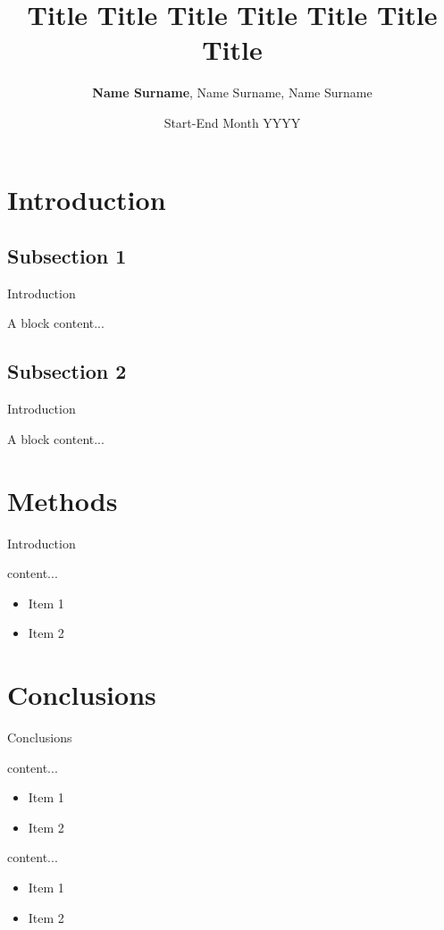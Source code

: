 \documentclass[10pt, aspectratio=169, handout]{aiasprestikz}
\author{\textbf{Name Surname}, Name Surname, Name Surname}
\affiliation{\textbf{Affil1}, Affil2}
\title{Title Title Title Title Title Title Title}
\date{Start-End Month YYYY}
\begin{document}
	
	\maketitle

	\section{Introduction}
	\subsection{Subsection 1}
	\begin{frame}{Introduction}
		\onslide<2->\begin{blox}{A block}
			content...
		\end{blox}
	\end{frame}
	
	\subsection{Subsection 2}
	\begin{frame}{Introduction}
		\onslide<2->\begin{blox}{A block}
			content...
		\end{blox}
	\end{frame}
	
	\section{Methods}
	\begin{frame}{Introduction}
		\begin{blox}{content...}
			\begin{itemize}
				\item Item 1
				\item Item 2
			\end{itemize}
		\end{blox}
	\end{frame}
	
	\section{Conclusions}
	\begin{frame}{Conclusions}
		\begin{blox}{content...}
			\begin{itemize}
				\item Item 1
				\item Item 2
			\end{itemize}
		\end{blox}
		
		\begin{blox}{content...}
			\begin{itemize}
				\item Item 1
				\item Item 2
			\end{itemize}
		\end{blox}
	\end{frame}
\end{document}
